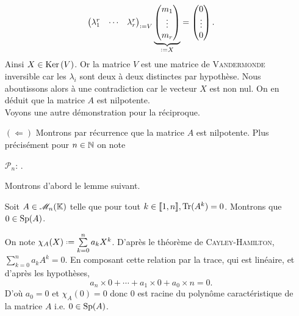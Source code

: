 \begin{preuve}
\begin{itemize}
$${\begin{pmatrix}
        \lambda_1^r & \cdots & \lambda_r^r
        \end{pmatrix}
        }_{\defeq V}
        \underbrace{
        \begin{pmatrix}
            m_1 \\ \vdots \\ m_r
        \end{pmatrix}
        }_{\defeq X}
        = 
        \begin{pmatrix}
        0 \\ \vdots \\ 0
        \end{pmatrix}.
        $$
        Ainsi $X \in \mathrm{Ker}\,(V)$. Or la matrice $V$ est une matrice de \textsc{Vandermonde} inversible car les $\lambda_i$ sont deux à deux distinctes par hypothèse. Nous aboutissons alors à une contradiction car le vecteur $X$ est non nul. On en déduit que la matrice $A$ est nilpotente. \\
        
        Voyons une autre démonstration pour la réciproque. \\ 
        \item[$(\Leftarrow)$] Montrons par récurrence que la matrice $A$ est nilpotente. Plus précisément pour $n \in \mathbb{N}$ on note
        \begin{center}
            $\mathscr{P}_n$: .
        \end{center}
        Montrons d'abord le lemme suivant.
        \begin{lemme}
            Soit $A \in \mathscr{M}_n(\mathbb{K})$ telle que pour tout $k \in \llbracket 1, n \rrbracket, \mathrm{Tr}(A^k) = 0$. Montrons que $0 \in \mathrm{Sp}(A)$.
        \end{lemme}
        On note $\chi_A(X) \defeq \sum\limits_{k=0}^n a_k X^k$. D'après le théorème de \textsc{Cayley}-\textsc{Hamilton}, $\sum\limits_{k=0}^n a_k A^k = 0$. En composant cette relation par la trace, qui est linéaire, et d'après les hypothèses, 
        $$a_n \times 0 + \cdots + a_1 \times 0 + a_0 \times n = 0.$$
        D'où $a_0 = 0$ et $\chi_A(0) = 0$ donc $0$ est racine du polynôme caractéristique de la matrice $A$ i.e. $0 \in \mathrm{Sp}(A)$. \\
        

\end{itemize}
\end{preuve}
